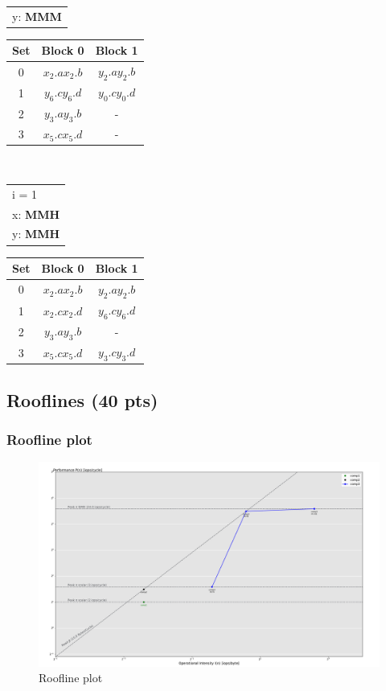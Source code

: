 \begin{enumerate}[label=\roman*. ]
\begin{table}[h!]
\begin{tabular}[t]{l}
        y: \textbf{MMM}\\
    \end{tabular}
    \begin{tabular}[t]{|c|c|c|}
    Set & Block 0 & Block 1 \\ \hline
    0 & $x_2.a$\quad$x_2.b$ & $y_2.a$\quad$y_2.b$ \\ \hline
    1 & $y_6.c$\quad$y_6.d$ & $y_0.c$\quad$y_0.d$ \\ \hline
    2 & $y_3.a$\quad$y_3.b$ & - \\ \hline
    3 & $x_5.c$\quad$x_5.d$ & - \\ \hline
    \end{tabular}
\end{table}\\
\begin{table}[h!]
    \begin{tabular}[t]{l}
        i = 1\\
        x: \textbf{MMH}\\
        y: \textbf{MMH}\\
    \end{tabular}
    \begin{tabular}[t]{|c|c|c|}
    Set & Block 0 & Block 1 \\ \hline
    0 & $x_2.a$\quad$x_2.b$ & $y_2.a$\quad$y_2.b$ \\ \hline
    1 & $x_2.c$\quad$x_2.d$ & $y_6.c$\quad$y_6.d$ \\ \hline
    2 & $y_3.a$\quad$y_3.b$ & - \\ \hline
    3 & $x_5.c$\quad$x_5.d$ & $y_3.c$\quad$y_3.d$ \\ \hline
    \end{tabular}
    \end{table}
\end{enumerate}
\subsection{Rooflines (40 pts)}
\subsubsection{Roofline plot}
\begin{figure}[h!]
    \centering
    \includegraphics[width=\linewidth]{../out/ex3a.pdf}
    \caption{Roofline plot}
    \label{fig:roofline}
\end{figure}
